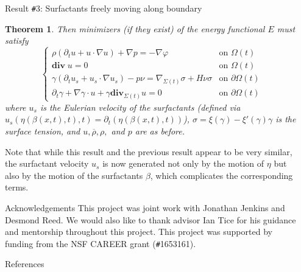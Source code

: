 \documentclass[final,noamsthm]{beamer}
\newtheorem{thm}{Theorem}
\renewcommand{\div}{\mathbf{div}}
\renewcommand{\bar}{\overline}
\def\p{\partial}
\newlength{\sepwidth}
\newlength{\colwidth}
\newcommand{\separatorcolumn}{\begin{column}{\sepwidth}\end{column}}
\begin{document}
\begin{frame}[t]
\begin{columns}[t]
\begin{column}{\colwidth}
\begin{block} {Result \texttt{\#}3: Surfactants freely moving along boundary}
\begin{thm}
                    Then minimizers (if they exist) of the energy functional $E$ must satisfy
                    \begin{equation}
                        \label{final_system}
                        \begin{cases}
                            \rho(\p_t u+u\cdot \nabla u) +\nabla p=-\nabla \varphi                         & \text{on }\Omega(t)   \\
                            \div\;u=0                                                                      & \text{on }\Omega(t)   \\
                            \gamma(\p_t u_s+u_s\cdot \nabla u_s)-p\nu=\nabla_{\Sigma(t)}\sigma+H\nu \sigma & \text{on }\p\Omega(t) \\
                            \p_t\gamma+\nabla\gamma\cdot u+\gamma\div_{\Sigma(t)}u=0                       & \text{on }\p\Omega(t)
                        \end{cases}
                    \end{equation}
                    where $u_s$ is the Eulerian velocity of the surfactants (defined via $u_s(\eta(\beta(x,t),t),t)=\p_t (\eta(\beta(x,t),t))$), $\sigma=\xi(\gamma)-\xi'(\gamma)\gamma$ is the surface tension, and $u,\bar \rho,\rho,$ and $p$ are as before.
                \end{thm}


                Note that while this result and the previous result appear to be very similar, the surfactant velocity $u_s$ is now generated not only by the motion of $\eta$ but also by the motion of the surfactants $\beta$, which complicates the corresponding terms. %
            \end{block}

            \begin{block}{Acknowledgements}
                This project was joint work with Jonathan Jenkins and Desmond Reed.
                We would also like to thank advisor Ian Tice for his guidance and mentorship throughout this project. This project was supported by funding from the NSF CAREER grant (\texttt{\#}1653161).
            \end{block}
            \begin{block}{References}
                \vspace{-0.3em}
                {\tiny
                    \nocite{*}
                    \begin{multicols}{2}
                        
                        
                \end{multicols}}
            \end{block}
        \end{column}
        \separatorcolumn
    \end{columns}
\end{frame}
\end{document}

